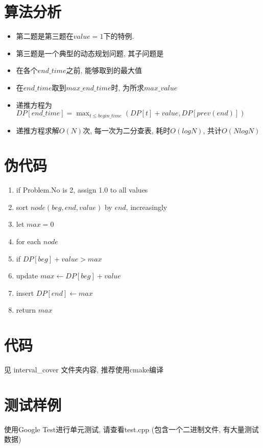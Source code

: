 \documentclass{article}
\begin{document}
\section{算法分析}
\begin{itemize}
	\item 第二题是第三题在$value=1$下的特例.
	\item 第三题是一个典型的动态规划问题, 其子问题是
	\item 在各个$end\_time$之前, 能够取到的最大值
	\item 在$end\_time$取到$max\_end\_time$时, 为所求$max\_value$
	\item 递推方程为$DP[end\_time] = \max_{t \leq begin\_time}(DP[t]+value, DP[prev(end)]) $
	\item 递推方程求解$O(N)$次, 每一次为二分查表, 耗时$O(log N)$, 共计$O(N logN)$
\end{itemize}	

\section{伪代码}
\begin{enumerate}
	\item if Problem.No is 2, assign 1.0 to all values
	\item sort $node(beg, end, value)$ by $end$, increasingly
	\item let $max = 0$
	\item for each $node$ 
	\item \quad if $DP[beg] + value > max$ 
	\item \qquad update $max \leftarrow DP[beg] + value$
	\item \qquad insert $DP[end] \leftarrow max$ 
	\item return $max$
\end{enumerate}
\section{代码}
见 interval\_cover 文件夹内容, 推荐使用cmake编译
\section{测试样例}
使用Google Test进行单元测试, 请查看test.cpp 
(包含一个二进制文件, 有大量测试数据)
\end{document}

